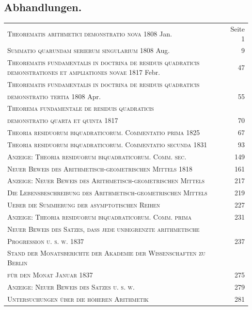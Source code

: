 \documentclass[10pt,a4paper]{article}
\begin{document}
\medskip

\subsection*{Abhandlungen.}

\begin{tabular}{p{8cm} r}
\textsc{Theorematis arithmetici demonstratio nova} 1808 Jan. & Seite 1 \\
\textsc{Summatio quarundam serierum singularium} 1808 Aug. & 9 \\
\textsc{Theorematis fundamentalis in doctrina de residuis quadraticis demonstrationes et ampliationes novae} 1817 Febr. & 47 \\
\textsc{Theorematis fundamentalis in doctrina de residuis quadraticis} & \\
\quad \textsc{demonstratio tertia} 1808 Apr. & 55 \\
\textsc{Theorema fundamentale de residuis quadraticis} & \\
\quad \textsc{demonstratio quarta et quinta} 1817 & 70 \\
\textsc{Theoria residuorum biquadraticorum. Commentatio prima} 1825 & 67 \\
\textsc{Theoria residuorum biquadraticorum. Commentatio secunda} 1831 & 93 \\
\textsc{Anzeige: Theoria residuorum biquadraticorum. Comm. sec.} & 149 \\
\textsc{Neuer Beweis des Arithmetisch-geometrischen Mittels} 1818 & 161 \\
\textsc{Anzeige: Neuer Beweis des Arithmetisch-geometrischen Mittels} & 217 \\
\textsc{Die Lebensbeschreibung des Arithmetisch-geometrischen Mittels} & 219 \\
\textsc{Ueber die Summierung der asymptotischen Reihen} & 227 \\
\textsc{Anzeige: Theoria residuorum biquadraticorum. Comm. prima} & 231 \\
\textsc{Neuer Beweis des Satzes, dass jede unbegrenzte arithmetische} & \\
\quad \textsc{Progression u. s. w.} 1837 & 237 \\
\textsc{Stand der Monatsberichte der Akademie der Wissenschaften zu Berlin} & \\
\quad \textsc{f\"ur den Monat Januar 1837} & 275 \\
\textsc{Anzeige: Neuer Beweis des Satzes u. s. w.} & 279 \\
\textsc{Untersuchungen \"uber die h\"oheren Arithmetik} & 281 \\
\end{tabular}
\end{document}
